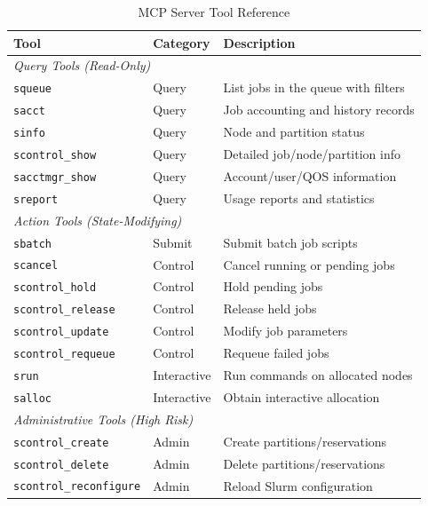 \begin{table}[H]
    \centering
    \caption{MCP Server Tool Reference}
    \label{tab:mcp-tools}
    \small
    \begin{tabular}{|l|l|l|}
        \hline
        \textbf{Tool} & \textbf{Category} & \textbf{Description} \\
        \hline
        \multicolumn{3}{|l|}{\textit{Query Tools (Read-Only)}} \\
        \hline
        \texttt{squeue} & Query & List jobs in the queue with filters \\
        \texttt{sacct} & Query & Job accounting and history records \\
        \texttt{sinfo} & Query & Node and partition status \\
        \texttt{scontrol\_show} & Query & Detailed job/node/partition info \\
        \texttt{sacctmgr\_show} & Query & Account/user/QOS information \\
        \texttt{sreport} & Query & Usage reports and statistics \\
        \hline
        \multicolumn{3}{|l|}{\textit{Action Tools (State-Modifying)}} \\
        \hline
        \texttt{sbatch} & Submit & Submit batch job scripts \\
        \texttt{scancel} & Control & Cancel running or pending jobs \\
        \texttt{scontrol\_hold} & Control & Hold pending jobs \\
        \texttt{scontrol\_release} & Control & Release held jobs \\
        \texttt{scontrol\_update} & Control & Modify job parameters \\
        \texttt{scontrol\_requeue} & Control & Requeue failed jobs \\
        \texttt{srun} & Interactive & Run commands on allocated nodes \\
        \texttt{salloc} & Interactive & Obtain interactive allocation \\
        \hline
        \multicolumn{3}{|l|}{\textit{Administrative Tools (High Risk)}} \\
        \hline
        \texttt{scontrol\_create} & Admin & Create partitions/reservations \\
        \texttt{scontrol\_delete} & Admin & Delete partitions/reservations \\
        \texttt{scontrol\_reconfigure} & Admin & Reload Slurm configuration \\

\end{tabular}
\end{table}
